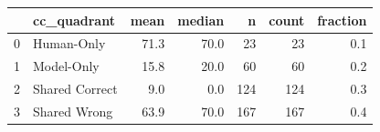 \begin{tabular}{llrrrrr}
\toprule
 & cc_quadrant & mean & median & n & count & fraction \\
\midrule
0 & Human-Only & 71.3 & 70.0 & 23 & 23 & 0.1 \\
1 & Model-Only & 15.8 & 20.0 & 60 & 60 & 0.2 \\
2 & Shared Correct & 9.0 & 0.0 & 124 & 124 & 0.3 \\
3 & Shared Wrong & 63.9 & 70.0 & 167 & 167 & 0.4 \\
\bottomrule
\end{tabular}
